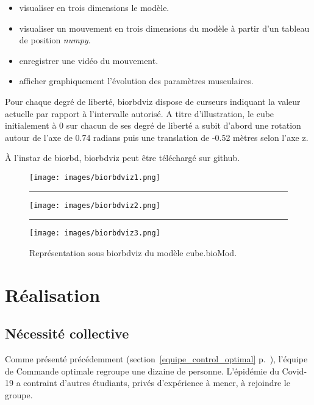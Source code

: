 \begin{itemize}
\setlength\itemsep{-0.5em}
\item visualiser en trois dimensions le modèle.
\item visualiser un mouvement en trois dimensions du modèle à partir d'un tableau de position \emph{\gls{numpy}}.
\item enregistrer une vidéo du mouvement.
\item afficher graphiquement l'évolution des paramètres musculaires.
\end{itemize}

Pour chaque degré de liberté, \gls{biorbdviz} dispose de curseurs indiquant la valeur actuelle par rapport à l'intervalle autorisé.
A titre d'illustration, le cube initialement à 0 sur chacun de ses degré de liberté a subit d'abord une rotation autour de l'axe de 0.74 radians puis une translation de -0.52 mètres selon l'axe z.

\`A l'instar de \gls{biorbd}, \gls{biorbdviz} peut être téléchargé sur \gls{github}\footnotemark[2].



\begin{figure}[ht]
\begin{center}
\texttt{[image: images/biorbdviz1.png]}
\rule{\linewidth}{0mm}
\texttt{[image: images/biorbdviz2.png]}
\rule{\linewidth}{0mm}
\texttt{[image: images/biorbdviz3.png]}
\caption{Représentation sous \gls{biorbdviz} du modèle cube.bioMod.}
\end{center}
\end{figure}

        
    \chapter{Réalisation}

        \section{Nécessité collective}
        
Comme présenté précédemment (section~\ref{equipe_control_optimal} p.~\pageref{equipe_control_optimal}), l'équipe de Commande optimale regroupe une dizaine de personne. L'épidémie du Covid-19 a contraint d'autres étudiants, privés d'expérience à mener, à rejoindre le groupe.


